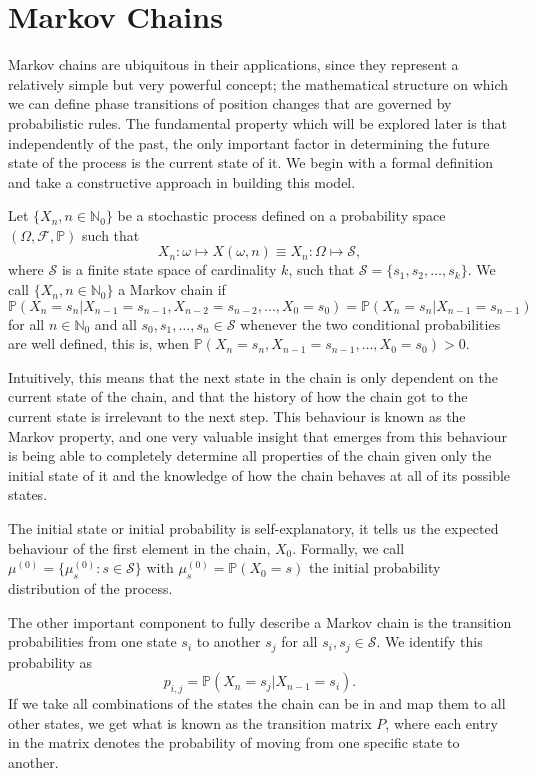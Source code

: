 \section{Markov Chains}

Markov chains are ubiquitous in their applications, since they represent a relatively simple but very powerful concept; the mathematical structure on which we can define phase transitions of position changes that are governed by probabilistic rules. The fundamental property which will be explored later is that independently of the past, the only important factor in determining the future state of the process is the current state of it. We begin with a formal definition and take a constructive approach in building this model. 

\begin{definition}
	Let $\{ X_n, n \in \mathbb{N}_0 \}$ be a stochastic process defined on a probability space $(\Omega, \mathcal{F}, \mathbb{P})$ such that
	\[ X_n: \omega \mapsto X(\omega, n) \equiv X_n : \Omega \mapsto \mathcal{S}, \]
	where $\mathcal{S}$ is a finite state space of cardinality $k$, such that $\mathcal{S} = \{ s_1, s_2, \ldots , s_k \}$. 
	We call $\{ X_n, n \in \mathbb{N}_0\}$ a Markov chain if 
	\[ \mathbb{P}(X_{n} = s_{n} | X_{n-1} = s_{n-1}, X_{n-2} = s_{n-2} , \ldots , X_0 = s_0 ) = \mathbb{P}(X_{n} = s_{n} | X_{n-1} = s_{n-1}) \]
	for all $n \in \mathbb{N}_0$ and all $s_0, s_1, \ldots , s_{n} \in \mathcal{S}$ whenever the two conditional probabilities are well defined, this is, when $\mathbb{P}(X_{n} = s_{n}, X_{n-1} = s_{n-1}, \ldots , X_0 = s_0) > 0$. 
\end{definition}

Intuitively, this means that the next state in the chain is only dependent on the current state of the chain, and that the history of how the chain got to the current state is irrelevant to the next step. 
This behaviour is known as the Markov property, and one very valuable insight that emerges from this behaviour is being able to completely determine all properties of the chain given only the initial state of it and the knowledge of how the chain behaves at all of its possible states. 

The initial state or initial probability is self-explanatory, it tells us the expected behaviour of the first element in the chain, $X_0$. Formally, we call $\mu^{(0)} = \{ \mu_s^{(0)} : s \in \mathcal{S} \}$ with $\mu_s^{(0)} = \mathbb{P}(X_0 = s)$ the initial probability distribution of the process. 

The other important component to fully describe a Markov chain is the transition probabilities from one state $s_i$ to another $s_j$ for all $s_i, s_j \in \mathcal{S}$. We identify this probability as 
\[ p_{i,j} = \mathbb{P}(X_{n} = s_j | X_{n-1} = s_i). \]
If we take all combinations of the states the chain can be in and map them to all other states, we get what is known as the transition matrix $P$, where each entry in the matrix denotes the probability of moving from one specific state to another. 

